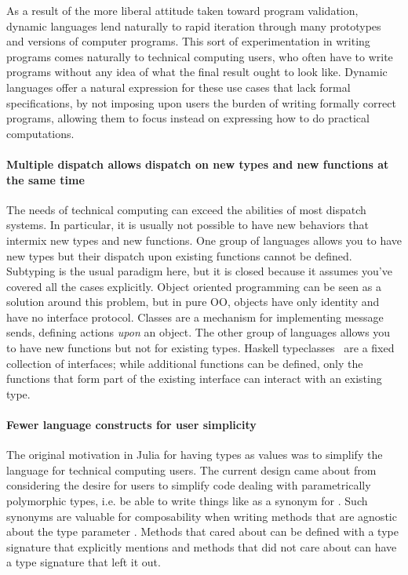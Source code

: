 As a result of the more liberal attitude taken toward program validation, dynamic languages lend naturally to rapid iteration through many prototypes and versions of computer programs. This sort of experimentation in writing programs comes naturally to technical computing users, who often have to write programs without any idea of what the final result ought to look like. Dynamic languages offer a natural expression for these use cases that lack formal specifications, by not imposing upon users the burden of writing formally correct programs, allowing them to focus instead on expressing how to do practical computations.

\paragraph{Multiple dispatch allows dispatch on new types and new functions at the same time}


The needs of technical computing can exceed the abilities of most dispatch systems. In particular, it is usually not possible to have new behaviors that intermix new types and new functions. One group of languages allows you to have new types but their dispatch upon existing functions cannot be defined. Subtyping is the usual paradigm here, but it is closed because it assumes you've covered all the cases explicitly. Object oriented programming can be seen as a solution around this problem, but in pure OO, objects have only identity and have no interface protocol. Classes are a mechanism for implementing message sends, defining actions \textit{upon} an object. The other group of languages allows you to have new functions but not for existing types. Haskell typeclasses~\cite{typeclass} are a fixed collection of interfaces; while additional functions can be defined, only the functions that form part of the existing interface can interact with an existing type.

\paragraph{Fewer language constructs for user simplicity}

The original motivation in Julia for having types as values was to simplify the
language for technical computing users. The current design came about from
considering the desire for users to simplify code dealing with parametrically
polymorphic types, i.e. be able to write things like  as a synonym
for . Such synonyms are valuable for composability when writing 
methods that are agnostic about the type parameter . Methods that cared
about  can be defined with a type signature that explicitly mentions
 and methods that did not care about  can have a type signature
that left it out.

